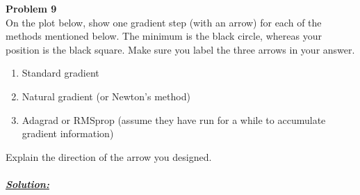 \documentclass{article}
\begin{document}
\newpage
\noindent \textbf{Problem 9} \\

\noindent On the plot below, show one gradient step (with an arrow) for each of the methods
mentioned below. The minimum is the black circle, whereas your position is the black 
square. Make sure you label the three arrows in your answer. 
\begin{enumerate}
  \item Standard gradient
  \item Natural gradient (or Newton’s method)
  \item Adagrad or RMSprop (assume they have run for a while to accumulate gradient
  information)
\end{enumerate}

\noindent Explain the direction of the arrow you designed. \\ \\

\noindent \underline{\textbf{\textit{Solution:}}} \\ 
\end{document}
